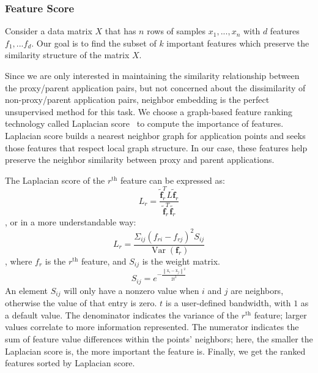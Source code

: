 \subsubsection{Feature Score}
\label{sec:feature_score}
Consider a data matrix $X$ that has $n$ rows of samples $x_{1},...,x_{n}$ with $d$ features $f_{1},...f_{d}$. Our goal is to find the subset of $k$ important features which preserve the similarity structure of the matrix $X$. 

Since we are only interested in maintaining the similarity relationship between the proxy/parent application pairs, but not concerned about the dissimilarity of non-proxy/parent application pairs, neighbor embedding is the perfect unsupervised method for this task. We choose a graph-based feature ranking technology called Laplacian score~\cite{he2005laplacian} to compute the importance of features.  Laplacian score builds a nearest neighbor graph for application points and seeks those features that respect local graph structure. In our case, these features help preserve the neighbor similarity between proxy and parent applications.  

The Laplacian score of the $r^\textrm{th}$ feature can be expressed as:
\begin{equation}L_{r}=\frac{\widetilde{\mathbf{f}}_{r}^{T} L \widetilde{\mathbf{f}}_{r}}{\widetilde{\mathbf{f}}_{r}^{T} \widetilde{\mathbf{f}_{r}}}
\end{equation}
, or in a more understandable way:
\begin{equation}
L_{r}=\frac{\Sigma_{i j}\left(f_{r i}-f_{r j}\right)^{2} S_{i j}}{\operatorname{Var}\left(\mathbf{f}_{r}\right)}
\end{equation} , where $f_r$ is the $r^\textrm{th}$ feature, and $S_{i j}$ is the weight matrix.  
\begin{equation}S_{i j}=e^{-\frac{\left\|\mathrm{x}_{i}-\mathrm{x}_{j}\right\|^{2}}{2t^{2}}}\end{equation}
An element $S_{i j}$ will only have a nonzero value when $i$ and $j$ are neighbors, otherwise the value of that entry is zero. $t$ is a user-defined bandwidth, with $1$ as a default value. The denominator indicates the variance of the $r^\textrm{th}$ feature; larger values correlate to more information represented. The numerator indicates the sum of feature value differences within the points' neighbors; here, the smaller the Laplacian score is, the more important the feature is. Finally, we get the ranked features sorted by Laplacian score.

